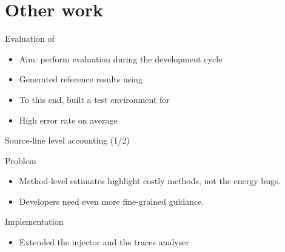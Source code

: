 \section{Other work}
%
%
\begin{frame}{Evaluation of \orka{}}
\begin{itemize}
\item Aim: perform evaluation during the development cycle
\item Generated reference results using \petra{}
\item To this end, built a \alert{test environment} for \orka{}
\item High error rate on average
\end{itemize}
\end{frame}
%
%
\begin{frame}{Source-line level accounting (1/2)}
\begin{block}{Problem}
\begin{itemize}
\item Method-level estimates highlight costly methods, not the energy bugs.
\item Developers need even more fine-grained guidance.
\end{itemize}
\end{block}
\begin{block}{Implementation}
\begin{itemize}
\item Extended the injector and the traces analyser
\end{itemize}
\end{block}
\end{frame}
